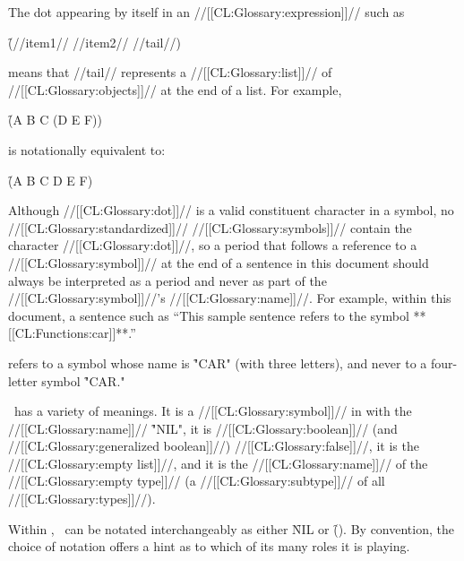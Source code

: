 \endsubsubsubsection%


The dot appearing by itself in an //[[CL:Glossary:expression]]// such as

\f{(//item1// //item2// {\dot} //tail//)}

means that //tail// represents a //[[CL:Glossary:list]]// of //[[CL:Glossary:objects]]//  at the end of a list.  For example,

\f{(A B C {\dot} (D E F))}

is notationally equivalent to:

\f{(A B C D E F)}

Although //[[CL:Glossary:dot]]// is a valid constituent character in a symbol, no  //[[CL:Glossary:standardized]]// //[[CL:Glossary:symbols]]// contain the character //[[CL:Glossary:dot]]//, so a period that follows a reference to a //[[CL:Glossary:symbol]]// at the end of a sentence in this document should always be interpreted as a period and never as part of the //[[CL:Glossary:symbol]]//'s //[[CL:Glossary:name]]//. For example, within this document, a sentence such as
 ``This sample sentence refers to the symbol **[[CL:Functions:car]]**.'' 

refers to a symbol whose name is \f{"CAR"} (with three letters), and never to a four-letter symbol \f{"CAR."}

\endsubsubsubsection%

\idxterm{()}

\nil\ has a variety of meanings. It is a //[[CL:Glossary:symbol]]// in  with the //[[CL:Glossary:name]]// \f{"NIL"}, it is //[[CL:Glossary:boolean]]// (and //[[CL:Glossary:generalized boolean]]//) //[[CL:Glossary:false]]//, it is the //[[CL:Glossary:empty list]]//, and it is the //[[CL:Glossary:name]]// of the //[[CL:Glossary:empty type]]// (a //[[CL:Glossary:subtype]]// of all //[[CL:Glossary:types]]//).

Within \clisp, \nil\ can be notated interchangeably as either \f{NIL} or \f{()}. By convention, the choice of notation offers a hint as to which of its many roles it is playing.


